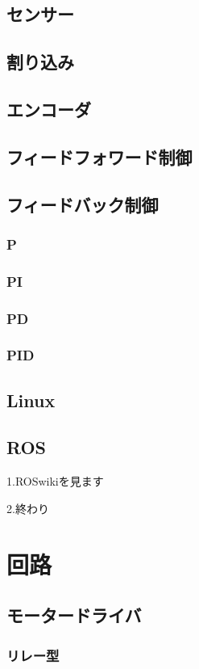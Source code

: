 \documentclass{jarticle}
\begin{document}
   \subsection{センサー}
   \subsection{割り込み}
   \subsection{エンコーダ}
   \subsection{フィードフォワード制御}
   \subsection{フィードバック制御}
      \subsubsection{P}
      \subsubsection{PI}
      \subsubsection{PD}
      \subsubsection{PID}
   \subsection{Linux}
   \subsection{ROS}
      1.ROSwikiを見ます

      2.終わり
\clearpage
\section{回路}
   \subsection{モータードライバ}
      \subsubsection{リレー型}
\end{document}
